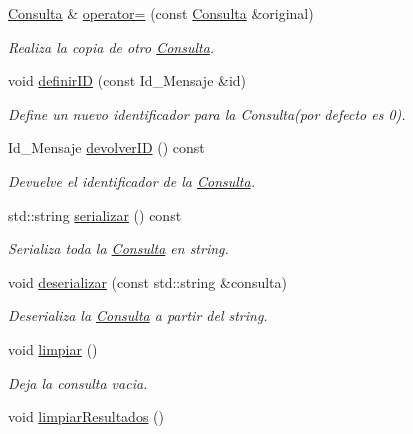 \begin{DoxyCompactItemize}
\item 
\hyperlink{classConsulta}{\-Consulta} \& \hyperlink{classConsulta_a6acfebe58cc8a740d57ce31276d47fa9}{operator=} (const \hyperlink{classConsulta}{\-Consulta} \&original)
\begin{DoxyCompactList}\small\item\em \-Realiza la copia de otro \hyperlink{classConsulta}{\-Consulta}. \end{DoxyCompactList}\item 
void \hyperlink{classConsulta_a70da0b4ca2b41a62eff57d6f52a67fb8}{definir\-I\-D} (const \-Id\-\_\-\-Mensaje \&id)
\begin{DoxyCompactList}\small\item\em \-Define un nuevo identificador para la \-Consulta(por defecto es 0). \end{DoxyCompactList}\item 
\-Id\-\_\-\-Mensaje \hyperlink{classConsulta_aedb25cbbcb6ee24cc846c29779678bd7}{devolver\-I\-D} () const 
\begin{DoxyCompactList}\small\item\em \-Devuelve el identificador de la \hyperlink{classConsulta}{\-Consulta}. \end{DoxyCompactList}\item 
std\-::string \hyperlink{classConsulta_a0d3fd7d84c1a68b8cbe31a4118150269}{serializar} () const 
\begin{DoxyCompactList}\small\item\em \-Serializa toda la \hyperlink{classConsulta}{\-Consulta} en string. \end{DoxyCompactList}\item 
void \hyperlink{classConsulta_ac3edafd9d21258d9e2b2db753b6a0b61}{deserializar} (const std\-::string \&consulta)
\begin{DoxyCompactList}\small\item\em \-Deserializa la \hyperlink{classConsulta}{\-Consulta} a partir del string. \end{DoxyCompactList}\item 
\hypertarget{classConsulta_a4029f6916b9f06308774422156a14cd3}{void \hyperlink{classConsulta_a4029f6916b9f06308774422156a14cd3}{limpiar} ()}\label{classConsulta_a4029f6916b9f06308774422156a14cd3}

\begin{DoxyCompactList}\small\item\em \-Deja la consulta vacia. \end{DoxyCompactList}\item 
\hypertarget{classConsulta_a9272b3e00577483b722ad30dd398e006}{void \hyperlink{classConsulta_a9272b3e00577483b722ad30dd398e006}{limpiar\-Resultados} ()}\label{classConsulta_a9272b3e00577483b722ad30dd398e006}


\end{DoxyCompactItemize}
